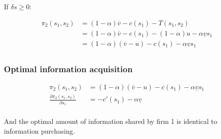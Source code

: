 \documentclass[a4paper,leqno]{article}%
\renewcommand{\a}{\alpha}
\newcommand{\uv}{\underline{v}}
\newcommand{\ov}{\overline{v}}
\begin{document}
If $\delta s\geq 0$:

\begin{equation}
    \begin{aligned}
      \pi_2(s_1,s_2)&=(1-\a)\ov-c(s_1)-T(s_1,s_2)\\
                    &=(1-\a)\ov-c(s_1)-(1-\a)u-\a \uv s_1\\
                    &=(1-\a)(\ov-u)-c(s_1)-\a\uv s_1\\
    \end{aligned}
\end{equation}

\subsubsection{Optimal information acquisition}


\medskip

\begin{equation}
    \begin{aligned}
      \pi_2(s_1,s_2)&=(1-\a)(\ov-u)-c(s_1)-\a \uv s_1\\
      \frac{\partial\pi_2(s_1,s_2)}{\partial s_1}&=-c'(s_1)-\a \uv \\
    \end{aligned}
\end{equation}

And the optimal amount of information shared by firm 1 is identical to information purchasing. 

\medskip
\end{document}
